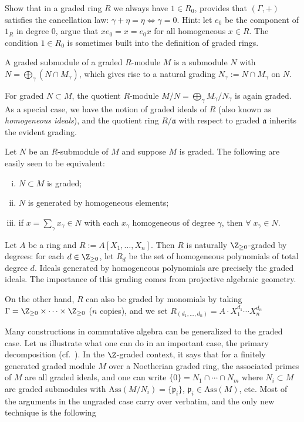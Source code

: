 \begin{exercise}
	Show that in a graded ring $R$ we always have $1 \in R_0$, provides that $(\Gamma, +)$ satisfies the cancellation law: $\gamma+\eta=\eta \iff \gamma=0$. Hint: let $e_0$ be the component of $1_R$ in degree 0, argue that $x e_0 = x = e_0 x$ for all homogeneous $x \in R$. The condition $1 \in R_0$ is sometimes built into the definition of graded rings.
\end{exercise}

\begin{definition}
	A graded submodule of a graded $R$-module $M$ is a submodule $N$ with $N = \bigoplus_\gamma (N \cap M_\gamma)$, which gives rise to a natural grading $N_\gamma := N \cap M_\gamma$ on $N$.
\end{definition}
For graded $N \subset M$, the quotient $R$-module $M/N = \bigoplus_\gamma M_\gamma/N_\gamma$ is again graded. As a special case, we have the notion of graded ideals of $R$ (also known as \emph{homogeneous ideals}), and the quotient ring $R/\mathfrak{a}$ with respect to graded $\mathfrak{a}$ inherits the evident grading.

Let $N$ be an $R$-submodule of $M$ and suppose $M$ is graded. The following are easily seen to be equivalent:
\begin{enumerate}[(i)]
	\item $N \subset M$ is graded;
	\item $N$ is generated by homogeneous elements;
	\item if $x = \sum_\gamma x_\gamma \in N$ with each $x_\gamma$ homogeneous of degree $\gamma$, then $\forall \; x_\gamma \in N$.
\end{enumerate}

\begin{example}
	Let $A$ be a ring and $R := A[X_1, \ldots, X_n]$. Then $R$ is naturally $\Z_{\geq 0}$-graded by degrees: for each $d \in \Z_{\geq 0}$, let $R_d$ be the set of homogeneous polynomials of total degree $d$. Ideals generated by homogeneous polynomials are precisely the graded ideals. The importance of this grading comes from projective algebraic geometry.

	On the other hand, $R$ can also be graded by monomials by taking $\Gamma = \Z_{\geq 0} \times \cdots \times \Z_{\geq 0}$ ($n$ copies), and we set $R_{(d_1, \ldots, d_n)} = A \cdot X_1^{d_1} \cdots X_n^{d_n}$
\end{example}

Many constructions in commutative algebra can be generalized to the graded case. Let us illustrate what one can do in an important case, the primary decomposition (cf.\ \cite[\S 3.5 and Exercise 3.5]{Eis95}). In the $\Z$-graded context, it says that for a finitely generated graded module $M$ over a Noetherian graded ring, the associated primes of $M$ are all graded ideals, and one can write $\{0\} = N_1 \cap \cdots \cap N_m$ where $N_i \subset M$ are graded submodules with $\text{Ass}(M/N_i) = \{\mathfrak{p}_i\}$, $\mathfrak{p}_i \in \text{Ass}(M)$, etc. Most of the arguments in the ungraded case carry over verbatim, and the only new technique is the following

